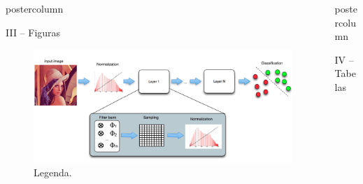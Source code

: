 \documentclass[final,hyperref={pdfpagelabels=false}]{beamer}
\newlength{\columnheight}
\begin{document}
\begin{frame}
\begin{columns}
\begin{column}{.45\textwidth}
\begin{beamercolorbox}[center,wd=\textwidth]{postercolumn}
\begin{minipage}[T]{.95\textwidth}
{\begin{block}{\vspace{-6pt} \large III -- Figuras}
							\begin{figure}[h]
								\centering
								\includegraphics[scale=1.00]{figs/deep.pdf}
								\caption{\small Legenda.}
								\label{f.deep_architecture}
							\end{figure}
														
						\end{block}
					}
				\end{minipage}
			\end{beamercolorbox}
		\end{column}
				
		\begin{column}{.54\textwidth}
			\begin{beamercolorbox}[center,wd=\textwidth]{postercolumn}
				\begin{minipage}[T]{.95\textwidth} %
					\parbox[t][\columnheight]{\textwidth}{ %
						\begin{block}{\vspace{-6pt} \large IV -- Tabelas}
														

\end{block}}
\end{minipage}
\end{beamercolorbox}
\end{column}
\end{columns}
\end{frame}
\end{document}
